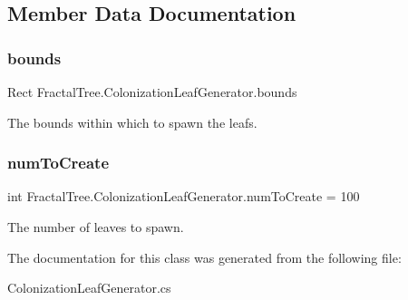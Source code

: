 \subsection{Member Data Documentation}
\hypertarget{class_fractal_tree_1_1_colonization_leaf_generator_aa9755eb054a0654d8eb9a03e8d4db0dd}{}\label{class_fractal_tree_1_1_colonization_leaf_generator_aa9755eb054a0654d8eb9a03e8d4db0dd} 
\subsubsection{\texorpdfstring{bounds}{bounds}}
{\footnotesize\ttfamily Rect Fractal\+Tree.\+Colonization\+Leaf\+Generator.\+bounds}



The bounds within which to spawn the leafs. 

\hypertarget{class_fractal_tree_1_1_colonization_leaf_generator_a8c80eb30ad9f225f5e5d146f8b633e0c}{}\label{class_fractal_tree_1_1_colonization_leaf_generator_a8c80eb30ad9f225f5e5d146f8b633e0c} 
\subsubsection{\texorpdfstring{num\+To\+Create}{numToCreate}}
{\footnotesize\ttfamily int Fractal\+Tree.\+Colonization\+Leaf\+Generator.\+num\+To\+Create = 100}



The number of leaves to spawn. 



The documentation for this class was generated from the following file\+:\begin{DoxyCompactItemize}
\item 
Colonization\+Leaf\+Generator.\+cs\end{DoxyCompactItemize}
